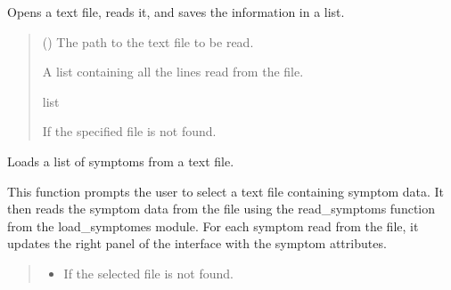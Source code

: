 \documentclass[letterpaper,10pt,english]{sphinxmanual}
\begin{document}
\begin{fulllineitems}
\begin{fulllineitems}
\label{\detokenize{general_interface:general_interface.InterfaceGenerale.lire_fichier}}
\pysigstartsignatures
{}
\pysigstopsignatures
\sphinxAtStartPar
Opens a text file, reads it, and saves the information in a list.
\begin{quote}\begin{description}
\sphinxAtStartPar
{} () \textendash{} The path to the text file to be read.

\sphinxAtStartPar
A list containing all the lines read from the file.

\sphinxAtStartPar
list

\sphinxAtStartPar
{} \textendash{} If the specified file is not found.

\end{description}\end{quote}

\end{fulllineitems}


\begin{fulllineitems}
\label{\detokenize{general_interface:general_interface.InterfaceGenerale.load_symptoms}}
\pysigstartsignatures
{}
\pysigstopsignatures
\sphinxAtStartPar
Loads a list of symptoms from a text file.

\sphinxAtStartPar
This function prompts the user to select a text file containing symptom data. It then reads the symptom data from the file
using the read\_symptoms function from the load\_symptomes module. For each symptom read from the file, it updates the right panel of
the interface with the symptom attributes.
\begin{quote}\begin{description}
\begin{itemize}
\item {} 
\sphinxAtStartPar
{} \textendash{} If the selected file is not found.


\end{itemize}
\end{description}
\end{quote}
\end{fulllineitems}
\end{fulllineitems}
\end{document}
